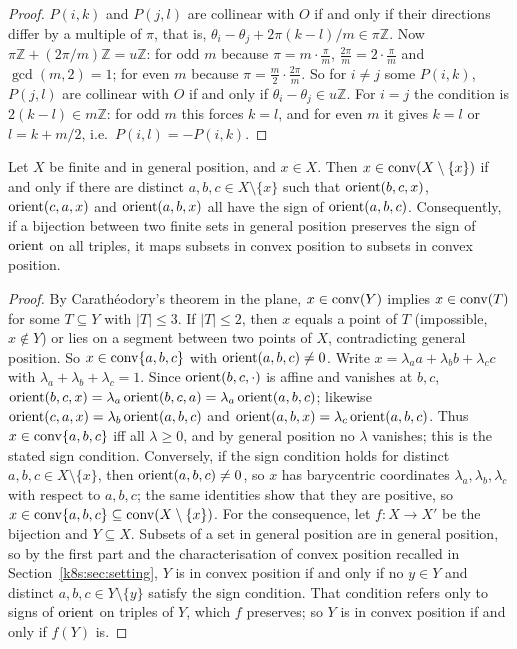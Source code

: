 \begin{proof}
$P(i,k)$ and $P(j,l)$ are collinear with $O$ if and only if their directions differ by a multiple of $\pi$, that is,
$\theta_i-\theta_j+2\pi(k-l)/m\in\pi\mathbb Z$. Now $\pi\mathbb Z+(2\pi/m)\mathbb Z=u\mathbb Z$: for odd $m$ because
$\pi=m\cdot\frac{\pi}{m}$, $\frac{2\pi}{m}=2\cdot\frac\pi m$ and $\gcd(m,2)=1$; for even $m$ because
$\pi=\frac m2\cdot\frac{2\pi}m$. So for $i\ne j$ some $P(i,k)$, $P(j,l)$ are collinear with $O$ if and only if
$\theta_i-\theta_j\in u\mathbb Z$. For $i=j$ the condition is $2(k-l)\in m\mathbb Z$: for odd $m$ this forces $k=l$, and for
even $m$ it gives $k=l$ or $l=k+m/2$, i.e.\ $P(i,l)=-P(i,k)$.
\end{proof}

\begin{lemma}\label{k8s:lem:convpos}
Let $X$ be finite and in general position, and $x\in X$. Then $x\in\operatorname{conv}(X\setminus\{x\})$ if and only if there are
distinct $a,b,c\in X\setminus\{x\}$ such that $\operatorname{orient}(b,c,x)$, $\operatorname{orient}(c,a,x)$ and $\operatorname{orient}(a,b,x)$ all have the sign
of $\operatorname{orient}(a,b,c)$. Consequently, if a bijection between two finite sets in general position preserves the sign of
$\operatorname{orient}$ on all triples, it maps subsets in convex position to subsets in convex position.
\end{lemma}

\begin{proof}
By Carath\'eodory's theorem in the plane, $x\in\operatorname{conv}(Y)$ implies $x\in\operatorname{conv}(T)$ for some $T\subseteq Y$ with
$|T|\le3$. If $|T|\le2$, then $x$ equals a point of $T$ (impossible, $x\notin Y$) or lies on a segment between two
points of $X$, contradicting general position. So $x\in\operatorname{conv}\{a,b,c\}$ with $\operatorname{orient}(a,b,c)\ne0$. Write
$x=\lambda_aa+\lambda_bb+\lambda_cc$ with $\lambda_a+\lambda_b+\lambda_c=1$. Since $\operatorname{orient}(b,c,\cdot)$ is affine and
vanishes at $b,c$, $\operatorname{orient}(b,c,x)=\lambda_a\operatorname{orient}(b,c,a)=\lambda_a\operatorname{orient}(a,b,c)$; likewise
$\operatorname{orient}(c,a,x)=\lambda_b\operatorname{orient}(a,b,c)$ and $\operatorname{orient}(a,b,x)=\lambda_c\operatorname{orient}(a,b,c)$. Thus $x\in\operatorname{conv}\{a,b,c\}$ iff all
$\lambda\ge0$, and by general position no $\lambda$ vanishes; this is the stated sign condition. Conversely, if the
sign condition holds for distinct $a,b,c\in X\setminus\{x\}$, then $\operatorname{orient}(a,b,c)\ne0$, so $x$ has barycentric
coordinates $\lambda_a,\lambda_b,\lambda_c$ with respect to $a,b,c$; the same identities show that they are positive,
so $x\in\operatorname{conv}\{a,b,c\}\subseteq\operatorname{conv}(X\setminus\{x\})$. For the consequence, let $f:X\to X'$ be the bijection and
$Y\subseteq X$. Subsets of a set in general position are in general position, so by the first part and the
characterisation of convex position recalled in Section~\ref{k8s:sec:setting}, $Y$ is in convex position if and only if
no $y\in Y$ and distinct $a,b,c\in Y\setminus\{y\}$ satisfy the sign condition. That condition refers only to signs of
$\operatorname{orient}$ on triples of $Y$, which $f$ preserves; so $Y$ is in convex position if and only if $f(Y)$ is.
\end{proof}

